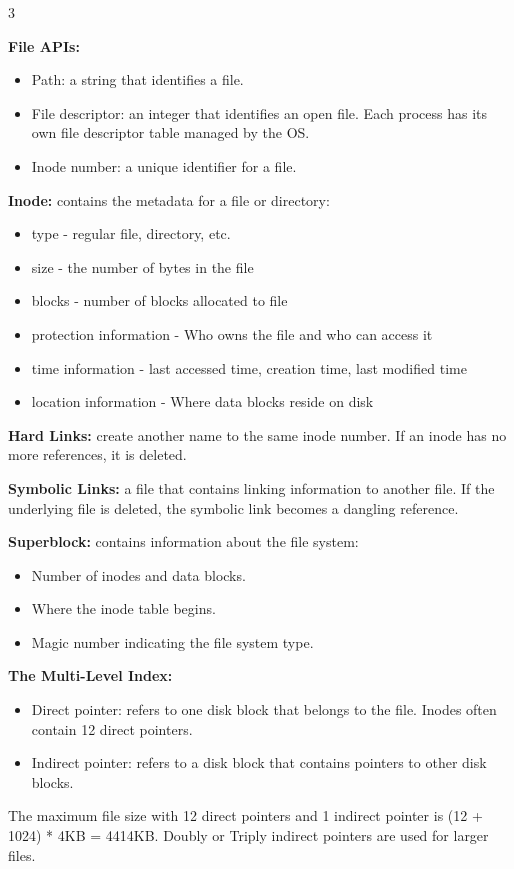 \documentclass[8pt]{innovativeinnovation-cheatsheet}
\begin{document}
\begin{multicols*}{3}

\textbf{File APIs:}
\begin{itemize}
      \item Path: a string that identifies a file.
      \item File descriptor: an integer that identifies an open file. Each process has its own file descriptor table managed by the OS.
      \item Inode number: a unique identifier for a file.
\end{itemize}

\textbf{Inode:} contains the metadata for a file or directory:
\begin{itemize}
      \item type - regular file, directory, etc.
      \item size - the number of bytes in the file
      \item blocks - number of blocks allocated to file
      \item protection information - Who owns the file and who can access it
      \item time information - last accessed time, creation time, last modified time
      \item location information - Where data blocks reside on disk
\end{itemize}

\textbf{Hard Links:} create another name to the same inode number. If an inode has no more references, it is deleted.

\textbf{Symbolic Links:} a file that contains linking information to another file. If the underlying file is deleted, the symbolic link becomes a dangling reference.

\textbf{Superblock:} contains information about the file system:
\begin{itemize}
      \item Number of inodes and data blocks.
      \item Where the inode table begins.
      \item Magic number indicating the file system type.
\end{itemize}

\textbf{The Multi-Level Index:}
\begin{itemize}
      \item Direct pointer: refers to one disk block that belongs to the file. Inodes often contain 12 direct pointers.
      \item Indirect pointer: refers to a disk block that contains pointers to other disk blocks.
\end{itemize}
The maximum file size with 12 direct pointers and 1 indirect pointer is (12 + 1024) * 4KB = 4414KB.
Doubly or Triply indirect pointers are used for larger files.


\end{multicols*}
\end{document}
